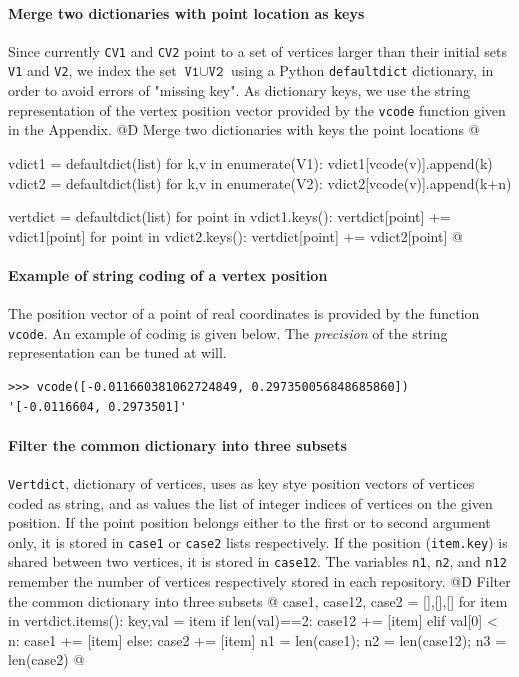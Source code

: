 \documentclass[11pt,oneside]{article}	%
\begin{document}
\paragraph{Merge two dictionaries with point location as keys}
Since currently \texttt{CV1} and \texttt{CV2} point to a set of vertices larger than their initial sets 
\texttt{V1} and \texttt{V2}, we index the set $\texttt{V1} \cup \texttt{V2}$ using a Python \texttt{defaultdict} dictionary, in order to avoid errors of "missing key". As dictionary keys, we use the string representation of the vertex position vector provided by the \texttt{vcode} function given in the Appendix.
@D Merge two dictionaries with keys the point locations
@{
	vdict1 = defaultdict(list)
	for k,v in enumerate(V1): vdict1[vcode(v)].append(k) 
	vdict2 = defaultdict(list)
	for k,v in enumerate(V2): vdict2[vcode(v)].append(k+n) 
	
	vertdict = defaultdict(list)
	for point in vdict1.keys(): vertdict[point] += vdict1[point]
	for point in vdict2.keys(): vertdict[point] += vdict2[point]
@}

\paragraph{Example of string coding of a vertex position}
The position vector of a point of real coordinates is provided by the function \texttt{vcode}.
An example of coding is given below. The \emph{precision} of the string representation can be tuned at will.
{\small
\begin{verbatim}
>>> vcode([-0.011660381062724849, 0.297350056848685860])
'[-0.0116604, 0.2973501]'
\end{verbatim}}



\paragraph{Filter the common dictionary into three subsets}
\texttt{Vertdict}, dictionary of vertices, uses as key stye position vectors of vertices coded as string, and as values the list of integer indices of vertices on the given position. If the point position belongs either to the first or to second argument only, it is stored in \texttt{case1} or \texttt{case2} lists respectively. If the position (\texttt{item.key}) is shared between two vertices, it is stored in \texttt{case12}.
The variables \texttt{n1}, \texttt{n2}, and \texttt{n12} remember the number of vertices respectively stored in each repository.
@D Filter the common dictionary into three subsets
@{
	case1, case12, case2 = [],[],[]
	for item in vertdict.items():
		key,val = item
		if len(val)==2:  case12 += [item]
		elif val[0] < n: case1 += [item]
		else: case2 += [item]
	n1 = len(case1); n2 = len(case12); n3 = len(case2)
@}
\end{document}
